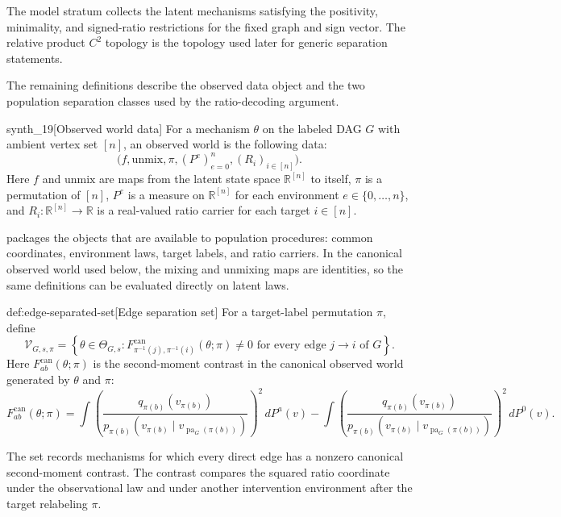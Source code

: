 \documentclass[11pt]{article}
\begin{document}
The model stratum  collects the latent mechanisms satisfying the positivity, minimality, and signed-ratio restrictions for the fixed graph and sign vector. The relative product \(C^2\) topology is the topology used later for generic separation statements.

The remaining definitions describe the observed data object and the two population separation classes used by the ratio-decoding argument.

\begin{definitionv}{synth_19}[Observed world data]
For a mechanism \(\theta\) on the labeled DAG \(G\) with ambient vertex set \([n]\), an observed world is the following data:
\[
\bigl(f,\mathrm{unmix},\pi,(P^e)_{e=0}^n,(R_i)_{i\in[n]}\bigr).
\]
Here \(f\) and \(\mathrm{unmix}\) are maps from the latent state space \(\mathbb R^{[n]}\) to itself, \(\pi\) is a permutation of \([n]\), \(P^e\) is a measure on \(\mathbb R^{[n]}\) for each environment \(e\in\{0,\ldots,n\}\), and \(R_i:\mathbb R^{[n]}\to\mathbb R\) is a real-valued ratio carrier for each target \(i\in[n]\).
\end{definitionv}

 packages the objects that are available to population procedures: common coordinates, environment laws, target labels, and ratio carriers. In the canonical observed world used below, the mixing and unmixing maps are identities, so the same definitions can be evaluated directly on latent laws.

\begin{definitionv}{def:edge-separated-set}[Edge separation set]
For a target-label permutation \(\pi\), define
\[
\mathcal V_{G,s,\pi}
=
\left\{
\theta\in\Theta_{G,s}:
F^{\mathrm{can}}_{\pi^{-1}(j),\pi^{-1}(i)}(\theta;\pi)\ne0
\text{ for every edge }j\to i\text{ of }G
\right\}.
\]
Here \(F^{\mathrm{can}}_{ab}(\theta;\pi)\) is the second-moment contrast in the canonical observed world generated by \(\theta\) and \(\pi\):
\[
F^{\mathrm{can}}_{ab}(\theta;\pi)
=
\int
\left(
\frac{q_{\pi(b)}(v_{\pi(b)})}
     {p_{\pi(b)}(v_{\pi(b)}\mid v_{\operatorname{pa}_G(\pi(b))})}
\right)^2
\,dP^{a}(v)
-
\int
\left(
\frac{q_{\pi(b)}(v_{\pi(b)})}
     {p_{\pi(b)}(v_{\pi(b)}\mid v_{\operatorname{pa}_G(\pi(b))})}
\right)^2
\,dP^0(v).
\]
\end{definitionv}

The set  records mechanisms for which every direct edge has a nonzero canonical second-moment contrast. The contrast  compares the squared ratio coordinate under the observational law and under another intervention environment after the target relabeling \(\pi\).
\end{document}
